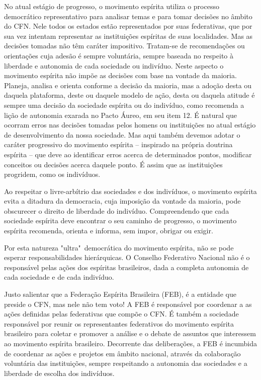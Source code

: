 No atual estágio de progresso, o movimento espírita utiliza o processo democrático representativo para analisar temas e para tomar decisões no âmbito do CFN. Nele todos os estados estão representados por suas federativas, que por sua vez intentam representar as instituições espíritas de suas localidades. Mas as decisões tomadas não têm caráter impositivo. Tratam-se de recomendações ou orientações cuja adesão é sempre voluntária, sempre baseada no respeito à liberdade e autonomia de cada sociedade ou indivíduo. Neste aspecto o movimento espírita não impõe as decisões com base na vontade da maioria. Planeja, analisa e orienta conforme a decisão da maioria, mas a adoção desta ou daquela plataforma, deste ou daquele modelo de ação, desta ou daquela atitude é sempre uma decisão da sociedade espírita ou do indivíduo, como recomenda a lição de autonomia exarada no Pacto Áureo, em seu item 12. É natural que ocorram erros nas decisões tomadas pelos homens ou instituições no atual estágio de desenvolvimento da nossa sociedade. Mas aqui também devemos adotar o caráter progressivo do movimento espírita -- inspirado na própria doutrina espírita -- que deve ao identificar erros acerca de determinados pontos, modificar conceitos ou decisões acerca daquele ponto. É assim que as instituições progridem, como os indivíduos. 

Ao respeitar o livre-arbítrio das sociedades e dos indivíduos, o movimento espírita evita a ditadura da democracia, cuja imposição da vontade da maioria, pode obscurecer o direito de liberdade do indivíduo. Compreendendo que cada sociedade espírita deve encontrar o seu caminho de progresso, o movimento espírita recomenda, orienta e informa, sem impor, obrigar ou exigir. 

Por esta natureza "ultra"\ democrática do movimento espírita, não se pode esperar responsabilidades hierárquicas. O Conselho Federativo Nacional não é o responsável pelas ações dos espíritas brasileiros, dada a completa autonomia de cada sociedade e de cada indivíduo. 

Justo salientar que a Federação Espírita Brasileira (FEB), é a entidade que preside o CFN, mas nele não tem voto! A FEB é responsável por coordenar a as ações definidas pelas federativas que compõe o CFN. É também a sociedade responsável por reunir os representantes federativos do movimento espírita brasileiro para coletar e promover a análise e o debate de assuntos que interessem ao movimento espírita brasileiro. Decorrente das deliberações, a FEB é incumbida de coordenar as ações e projetos em âmbito nacional, através da colaboração voluntária das instituições, sempre respeitando a autonomia das sociedades e a liberdade de escolha dos indivíduos. 

